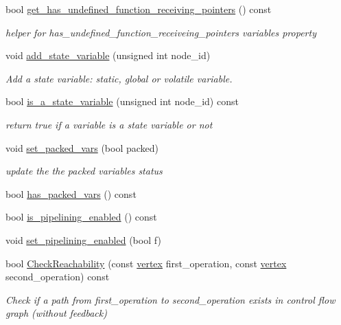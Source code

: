 \begin{DoxyCompactItemize}
bool \hyperlink{classFunctionBehavior_af51fe56b7c40304ec996f46833c92832}{get\+\_\+has\+\_\+undefined\+\_\+function\+\_\+receiving\+\_\+pointers} () const
\begin{DoxyCompactList}\small\item\em helper for has\+\_\+undefined\+\_\+function\+\_\+receiveing\+\_\+pointers variables property \end{DoxyCompactList}\item 
void \hyperlink{classFunctionBehavior_adf55d9eeebe01c1a7d54acf6f220cb05}{add\+\_\+state\+\_\+variable} (unsigned int node\+\_\+id)
\begin{DoxyCompactList}\small\item\em Add a state variable\+: static, global or volatile variable. \end{DoxyCompactList}\item 
bool \hyperlink{classFunctionBehavior_a067992cea7b3f052c5f04a7ac0a8b3d7}{is\+\_\+a\+\_\+state\+\_\+variable} (unsigned int node\+\_\+id) const
\begin{DoxyCompactList}\small\item\em return true if a variable is a state variable or not \end{DoxyCompactList}\item 
void \hyperlink{classFunctionBehavior_afc93676836d8024377b01148ab16700d}{set\+\_\+packed\+\_\+vars} (bool packed)
\begin{DoxyCompactList}\small\item\em update the the packed variables status \end{DoxyCompactList}\item 
bool \hyperlink{classFunctionBehavior_af7f416651e36cf88597c202457bbdef6}{has\+\_\+packed\+\_\+vars} () const
\item 
bool \hyperlink{classFunctionBehavior_aaf9d8cbd3f3d119c24c22e7da798cab4}{is\+\_\+pipelining\+\_\+enabled} () const
\item 
void \hyperlink{classFunctionBehavior_ada30b8554c0902020ba451004ebd4f30}{set\+\_\+pipelining\+\_\+enabled} (bool f)
\item 
bool \hyperlink{classFunctionBehavior_abac17bd921424216c7f67c0a7d276c6e}{Check\+Reachability} (const \hyperlink{graph_8hpp_abefdcf0544e601805af44eca032cca14}{vertex} first\+\_\+operation, const \hyperlink{graph_8hpp_abefdcf0544e601805af44eca032cca14}{vertex} second\+\_\+operation) const
\begin{DoxyCompactList}\small\item\em Check if a path from first\+\_\+operation to second\+\_\+operation exists in control flow graph (without feedback) \end{DoxyCompactList}\item 

\end{DoxyCompactItemize}
